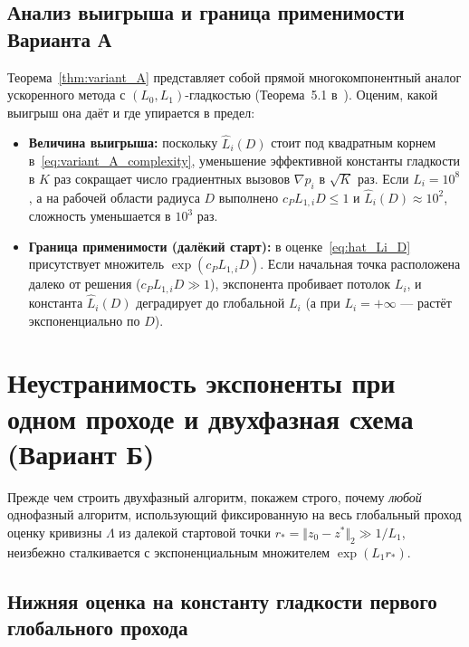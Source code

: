 \documentclass[11pt, a4paper]{article}
\theoremstyle{definition}
\begin{document}
\subsection{Анализ выигрыша и граница применимости Варианта А}

Теорема~\ref{thm:variant_A} представляет собой прямой многокомпонентный аналог ускоренного метода с $(L_0, L_1)$-гладкостью (Теорема~5.1 в~\cite{Gorbunov2024}). Оценим, какой выигрыш она даёт и где упирается в предел:
\begin{itemize}
    \item \textbf{Величина выигрыша:} поскольку $\widehat{L}_i(D)$ стоит под квадратным корнем в~\eqref{eq:variant_A_complexity}, уменьшение эффективной константы гладкости в $K$ раз сокращает число градиентных вызовов $\nabla p_i$ в $\sqrt{K}$ раз. Если $L_i = 10^8$, а на рабочей области радиуса $D$ выполнено $c_P L_{1,i} D \le 1$ и $\widehat{L}_i(D) \approx 10^2$, сложность уменьшается в $10^3$ раз.
    \item \textbf{Граница применимости (далёкий старт):} в оценке~\eqref{eq:hat_Li_D} присутствует множитель $\exp(c_P L_{1,i} D)$. Если начальная точка расположена далеко от решения ($c_P L_{1,i} D \gg 1$), экспонента пробивает потолок $L_i$, и константа $\widehat{L}_i(D)$ деградирует до глобальной $L_i$ (а при $L_i = +\infty$ --- растёт экспоненциально по $D$).
\end{itemize}

\section{Неустранимость экспоненты при одном проходе и двухфазная схема (Вариант Б)}

Прежде чем строить двухфазный алгоритм, покажем строго, почему \emph{любой} однофазный алгоритм, использующий фиксированную на весь глобальный проход оценку кривизны $\Lambda$ из далекой стартовой точки $r_* = \Vert z_0 - z^* \Vert_2 \gg 1/L_1$, неизбежно сталкивается с экспоненциальным множителем $\exp(L_1 r_*)$.

\subsection{Нижняя оценка на константу гладкости первого глобального прохода}
\end{document}
